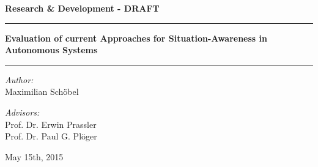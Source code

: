\documentclass{scrartcl}
\begin{document}
\begin{center}
\LARGE
\textbf{Research \& Development - DRAFT}

\vspace{2cm}

\rule{\linewidth}{2pt}
\textbf{Evaluation of current Approaches for Situation-Awareness in Autonomous Systems} \\
\rule{\linewidth}{2pt}
\bigskip

\normalsize
\textit{Author:}\\
Maximilian Schöbel
\bigskip

\textit{Advisors:}\\
Prof. Dr. Erwin Prassler\\
Prof. Dr. Paul G. Plöger

\vspace{4cm}
May 15th, 2015
\end{center}

\newpage

\tableofcontents

\newpage






\end{document}

